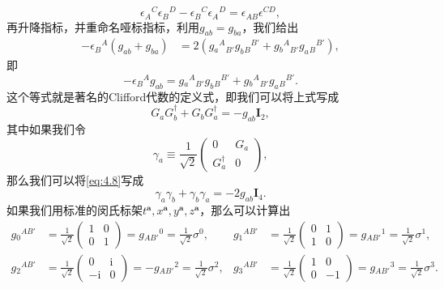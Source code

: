 \begin{equation*}
	\epsilon {_{A}}^{C} \epsilon {_{B}}^{D} -\epsilon {_{B}}^{C} \epsilon {_{A}}^{D} =\epsilon _{AB} \epsilon ^{CD} ,
\end{equation*}再升降指标，并重命名哑标指标，利用$g_{ab} =g_{ba}$，我们给出
\begin{equation*}
	\begin{aligned}
		-\epsilon {_{B}}^{A} (g_{ab} +g_{ba} ) & =2(g{_{a}}^{A}{}_{B'} g_{b}{}{_{B}}^{B'} +g{_{b}}^{A}{}_{B'} g_{a}{}{_{B}}^{B'} ),
	\end{aligned}
\end{equation*}
即
\begin{equation*}
	-\epsilon {_{B}}^{A} g_{ab} =g{_{a}}^{A}{}_{B'} g_{b}{}{_{B}}^{B'} +g{_{b}}^{A}{}_{B'} g_{a}{}{_{B}}^{B'} .
\end{equation*}
这个等式就是著名的Clifford代数的定义式，即我们可以将上式写成
\begin{equation}
	G_{a} G_{b}^{\dagger } +G_{b} G_{a}^{\dagger } =-g_{ab}\boldsymbol{I}_{2} ,
	\label{eq:4.8}
\end{equation}
其中如果我们令
\begin{equation*}
	\gamma _{a} \equiv \frac{1}{\sqrt{2}}\begin{pmatrix}
		0 & G_{a}\\
		G_{a}^{\dagger } & 0
	\end{pmatrix} ,
\end{equation*}
那么我们可以将\ref{eq:4.8}写成
\begin{equation*}
	\gamma _{a} \gamma _{b} +\gamma _{b} \gamma _{a} =-2g_{ab}\boldsymbol{I}_{4} .
\end{equation*}
如果我们用标准的闵氏标架$t^{\boldsymbol{a}} ,x^{\boldsymbol{a}} ,y^{\boldsymbol{a}} ,z^{\boldsymbol{a}}$，那么可以计算出
\begin{equation*}
	\begin{aligned}
		g{_{0}}^{AB'} & =\frac{1}{\sqrt{2}}\begin{pmatrix}
			1 & 0\\
			0 & 1
		\end{pmatrix} =g{_{AB'}}^{0} =\frac{1}{\sqrt{2}} \sigma ^{0} , & g{_{1}}^{AB'} & =\frac{1}{\sqrt{2}}\begin{pmatrix}
			0 & 1\\
			1 & 0
		\end{pmatrix} =g{_{AB'}}^{1} =\frac{1}{\sqrt{2}} \sigma ^{1} ,\\
		g{_{2}}^{AB'} & =\frac{1}{\sqrt{2}}\begin{pmatrix}
			0 & \mathrm{i}\\
			-\mathrm{i} & 0
		\end{pmatrix} =-g{_{AB'}}^{2} =\frac{1}{\sqrt{2}} \sigma ^{2} , & g{_{3}}^{AB'} & =\frac{1}{\sqrt{2}}\begin{pmatrix}
			1 & 0\\
			0 & -1
		\end{pmatrix} =g{_{AB'}}^{3} =\frac{1}{\sqrt{2}} \sigma ^{3} .
	\end{aligned}
\end{equation*}

